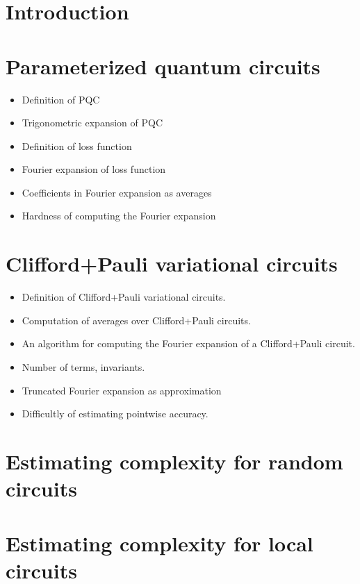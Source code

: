 \documentclass[twocolumn, amsfonts, amssymb, aps, nofootinbib]{revtex4-2}
\newcommand{\CP}{Clifford+Pauli}
\begin{document}
\maketitle

\tableofcontents

\section{Introduction}
\section{Parameterized quantum circuits}
\begin{itemize}
	\item Definition of PQC
	\item Trigonometric expansion of PQC
	\item Definition of loss function
	\item Fourier expansion of loss function
	\item Coefficients in Fourier expansion as averages
	\item Hardness of computing the Fourier expansion
\end{itemize}
\section{\CP{} variational circuits}
\begin{itemize}
	\item Definition of \CP{} variational circuits.
	\item Computation of averages over \CP{} circuits.
	\item An algorithm for computing the Fourier expansion of a \CP{} circuit.
	\item Number of terms, invariants.
	\item Truncated Fourier expansion as approximation
	\item Difficultly of estimating pointwise accuracy.
\end{itemize}
\section{Estimating complexity for random circuits}
\section{Estimating complexity for local circuits}



\end{document}
